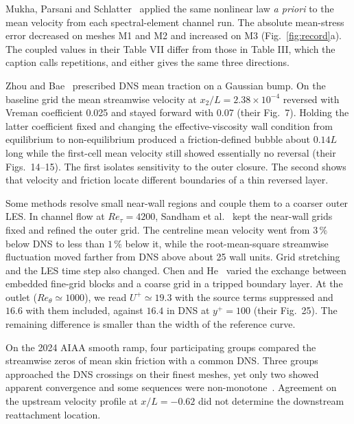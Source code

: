 \documentclass[pdflatex,sn-nature,iicol]{sn-jnl}
\begin{document}
Mukha, Parsani and Schlatter~\cite{Mukha2025} applied the same nonlinear law \emph{a priori} to the mean velocity from each spectral-element channel run. The absolute mean-stress error decreased on meshes M1 and M2 and increased on M3 (Fig.~\ref{fig:record}a). The coupled values in their Table VII differ from those in Table III, which the caption calls repetitions, and either gives the same three directions.

Zhou and Bae~\cite{ZhouBae2024} prescribed DNS mean traction on a Gaussian bump. On the baseline grid the mean streamwise velocity at $x_2/L=2.38\times10^{-4}$ reversed with Vreman coefficient 0.025 and stayed forward with 0.07 (their Fig.~7). Holding the latter coefficient fixed and changing the effective-viscosity wall condition from equilibrium to non-equilibrium produced a friction-defined bubble about $0.14L$ long while the first-cell mean velocity still showed essentially no reversal (their Figs.~14--15). The first isolates sensitivity to the outer closure. The second shows that velocity and friction locate different boundaries of a thin reversed layer.

Some methods resolve small near-wall regions and couple them to a coarser outer LES. In channel flow at $Re_\tau=4200$, Sandham et al.~\cite{Sandham2017} kept the near-wall grids fixed and refined the outer grid. The centreline mean velocity went from $3\,\%$ below DNS to less than $1\,\%$ below it, while the root-mean-square streamwise fluctuation moved farther from DNS above about 25 wall units. Grid stretching and the LES time step also changed. Chen and He~\cite{Chen2023} varied the exchange between embedded fine-grid blocks and a coarse grid in a tripped boundary layer. At the outlet ($Re_\theta\simeq1000$), we read $U^+\simeq19.3$ with the source terms suppressed and $16.6$ with them included, against $16.4$ in DNS at $y^+=100$ (their Fig.~25). The remaining difference is smaller than the width of the reference curve.

On the 2024 AIAA smooth ramp, four participating groups compared the streamwise zeros of mean skin friction with a common DNS. Three groups approached the DNS crossings on their finest meshes, yet only two showed apparent convergence and some sequences were non-monotone~\cite{Garmann2024}. Agreement on the upstream velocity profile at $x/L=-0.62$ did not determine the downstream reattachment location.
\end{document}
